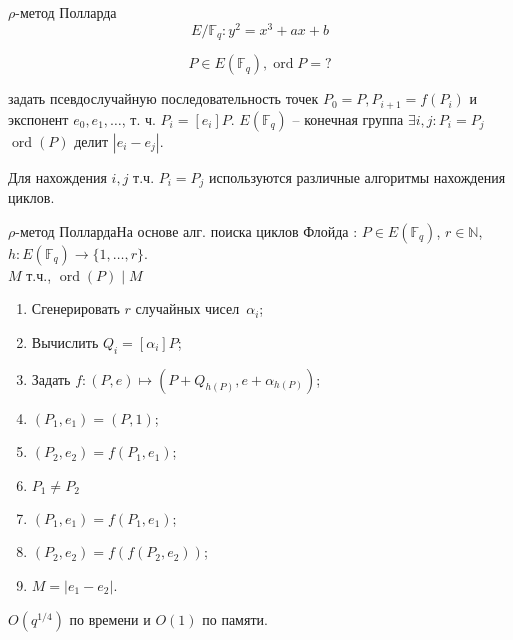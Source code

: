 \documentclass{beamer}
\begin{document}
\begin{frame}{$\rho$-метод Полларда}
	\[E/\mathbb{F}_q: y^2 = x^3 + a x + b\]
	
	\[P \in E(\mathbb{F}_q), \operatorname{ord}{P} = ?\]
	
	 задать псевдослучайную последовательность точек $P_0 = P, P_{i+1} = f(P_{i})$ и экспонент $e_0, e_1, \ldots$, т. ч. $P_i = [e_i] P$. $E(\mathbb{F}_q)$ -- конечная группа \MyImplies $\exists i, j: P_i = P_j$ \MyImplies $\operatorname{ord}(P)$ делит $|e_i - e_j|$.
	
	\vspace{1em}
	Для нахождения $i,j$ т.ч. $P_i = P_j$ используются различные алгоритмы нахождения циклов.
	
\end{frame}

\begin{frame}{$\rho$-метод Полларда}{На основе алг. поиска циклов Флойда}
	: $P \in E(\mathbb{F}_q)$, $r \in \mathbb{N}$, $h: E(\mathbb{F}_q) \rightarrow \{1, \ldots, r\}$. \\
	 $M$ т.ч., $\operatorname{ord}(P) \mid M$\\
	\begin{enumerate}
		\item Сгенерировать $r$ случайных чисел~$\alpha_i$;
		\item Вычислить $Q_i = [\alpha_i] P$;
		\item Задать $f: (P, e) \mapsto (P + Q_{h(P)}, e+\alpha_{h(P)})$;
		\item $(P_1, e_1) = (P, 1)$;
		\item $(P_2, e_2) = f(P_1, e_1)$;
		\item {} $P_1 \neq P_2$ 
		\item \quad $(P_1, e_1) = f(P_1, e_1)$;
		\item \quad $(P_2, e_2) = f(f(P_2, e_2))$;
		\item {} $M = |e_1 - e_2|$.
	\end{enumerate}
	
	\vspace{1em}
	 $O({q^{1/4}})$ по времени и $O(1)$ по памяти. 
\end{frame}

\end{document}
